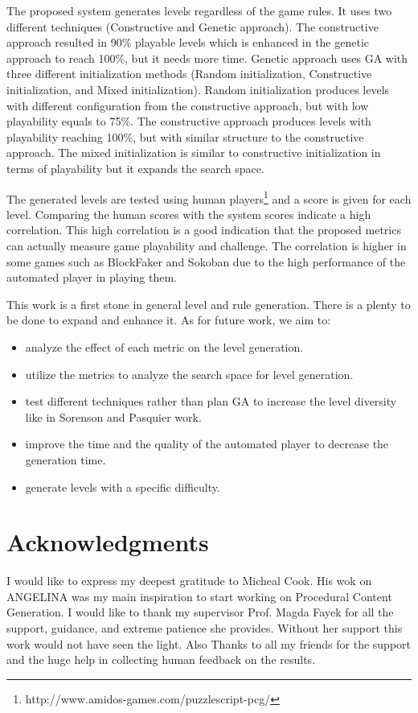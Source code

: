 \documentclass[letterpaper]{article}
\begin{document}
The proposed system generates levels regardless of the game rules. It uses two different techniques (Constructive and Genetic approach). The constructive approach resulted in 90\% playable levels which is enhanced in the genetic approach to reach 100\%, but it needs more time. Genetic approach uses GA with three different initialization methods (Random initialization, Constructive initialization, and Mixed initialization). Random initialization produces levels with different configuration from the constructive approach, but with low playability equals to 75\%.  The constructive approach produces levels with playability reaching 100\%, but with similar structure to the constructive approach. The mixed initialization is similar to constructive initialization in terms of playability but it expands the search space.\\\par

The generated levels are tested using human players\footnote{http://www.amidos-games.com/puzzlescript-pcg/} and a score is given for each level. Comparing the human scores with the system scores indicate a high correlation. This high correlation is a good indication that the proposed metrics can actually measure game playability and challenge. The correlation is higher in some games such as BlockFaker and Sokoban due to the high performance of the automated player in playing them.\\\par

This work is a first stone in general level and rule generation. There is a plenty to be done to expand and enhance it. As for future work, we aim to:
\begin{itemize}
	\item analyze the effect of each metric on the level generation.
	\item utilize the metrics to analyze the search space for level generation.
	\item test different techniques rather than plan GA to increase the level diversity like in Sorenson and Pasquier work\cite{genericLevelFramework}.
	\item improve the time and the quality of the automated player to decrease the generation time.
	\item generate levels with a specific difficulty.
\end{itemize}

\section{Acknowledgments}
I would like to express my deepest gratitude to Micheal Cook. His wok on ANGELINA was my main inspiration to start working on Procedural Content Generation. I would like to thank my supervisor Prof. Magda Fayek for all the support, guidance, and extreme patience she provides. Without her support this work would not have seen the light. Also Thanks to all my friends for the support and the huge help in collecting human feedback on the results.



\end{document}
